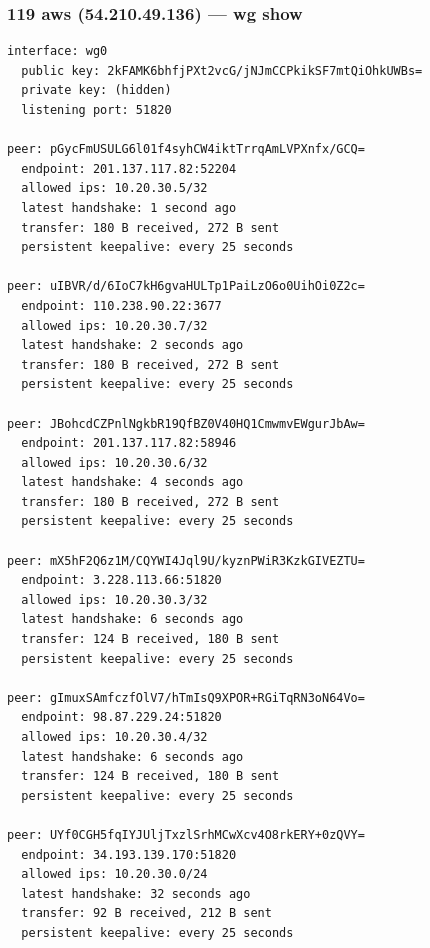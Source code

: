 \documentclass[11pt,a4paper]{article}
\begin{document}
\subsubsection*{119 aws (54.210.49.136) — wg show}
\begin{lstlisting}
interface: wg0
  public key: 2kFAMK6bhfjPXt2vcG/jNJmCCPkikSF7mtQiOhkUWBs=
  private key: (hidden)
  listening port: 51820

peer: pGycFmUSULG6l01f4syhCW4iktTrrqAmLVPXnfx/GCQ=
  endpoint: 201.137.117.82:52204
  allowed ips: 10.20.30.5/32
  latest handshake: 1 second ago
  transfer: 180 B received, 272 B sent
  persistent keepalive: every 25 seconds

peer: uIBVR/d/6IoC7kH6gvaHULTp1PaiLzO6o0UihOi0Z2c=
  endpoint: 110.238.90.22:3677
  allowed ips: 10.20.30.7/32
  latest handshake: 2 seconds ago
  transfer: 180 B received, 272 B sent
  persistent keepalive: every 25 seconds

peer: JBohcdCZPnlNgkbR19QfBZ0V40HQ1CmwmvEWgurJbAw=
  endpoint: 201.137.117.82:58946
  allowed ips: 10.20.30.6/32
  latest handshake: 4 seconds ago
  transfer: 180 B received, 272 B sent
  persistent keepalive: every 25 seconds

peer: mX5hF2Q6z1M/CQYWI4Jql9U/kyznPWiR3KzkGIVEZTU=
  endpoint: 3.228.113.66:51820
  allowed ips: 10.20.30.3/32
  latest handshake: 6 seconds ago
  transfer: 124 B received, 180 B sent
  persistent keepalive: every 25 seconds

peer: gImuxSAmfczfOlV7/hTmIsQ9XPOR+RGiTqRN3oN64Vo=
  endpoint: 98.87.229.24:51820
  allowed ips: 10.20.30.4/32
  latest handshake: 6 seconds ago
  transfer: 124 B received, 180 B sent
  persistent keepalive: every 25 seconds

peer: UYf0CGH5fqIYJUljTxzlSrhMCwXcv4O8rkERY+0zQVY=
  endpoint: 34.193.139.170:51820
  allowed ips: 10.20.30.0/24
  latest handshake: 32 seconds ago
  transfer: 92 B received, 212 B sent
  persistent keepalive: every 25 seconds

\end{lstlisting}
\end{document}
